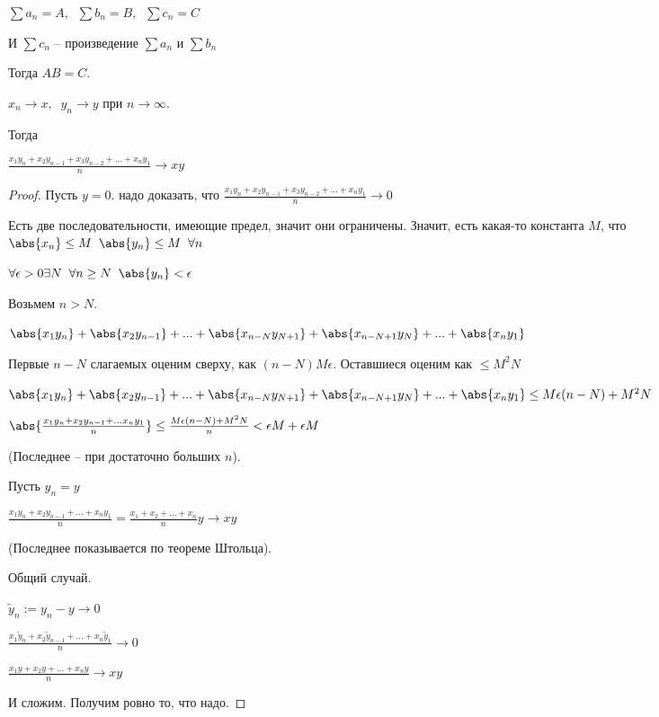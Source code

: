 
\begin{theorem}[Абеля]\slashns
	
	$\sum a_n = A, \;\; \sum b_n = B, \;\; \sum c_n = C$
	
	И $\sum c_n$ -- произведение $\sum a_n$ и $\sum b_n$
	
	Тогда $AB=C$.
\end{theorem}

\begin{lemma}\slashns
	
	$x_n \to x,\;\;y_n \to y$ при $n\to\infty$.
	
	Тогда 
	
	$\frac{x_1y_n+x_2y_{n-1}+x_3y_{n-2}+...+x_ny_1}{n} \to xy$
\end{lemma}

\begin{proof}\slashns
	
	Пусть $y = 0$. надо доказать, что $\frac{x_1y_n+x_2y_{n-1}+x_3y_{n-2}+...+x_ny_1}{n} \to 0$
	
	Есть две последовательности, имеющие предел, значит они ограничены. Значит, есть какая-то константа $M$, что $\abs{x_n} \le M \;\; \abs{y_n} \le M \;\; \forall n$
	
	$\forall \epsilon > 0 \exists N \;\; \forall n \ge N \;\; \abs{y_n} < \epsilon$
	
	Возьмем $n > N$.
	
	$\abs{x_1y_n}+\abs{x_2y_{n-1}}+...+\abs{x_{n - N}y_{N+1}} + \abs{x_{n - N + 1}y_{N}} + ...+ \abs{x_ny_1}$
	
	Первые $n-N$ слагаемых оценим сверху, как $(n-N)M\epsilon$. Оставшиеся оценим как $\le M^2N$
	
	$\abs{x_1y_n}+\abs{x_2y_{n-1}}+...+\abs{x_{n - N}y_{N+1}} + \abs{x_{n - N + 1}y_{N}} + ...+ \abs{x_ny_1} \le M\epsilon(n-N) + M^2N$
	
	$\abs{\frac{x_1y_n + x_2y_{n-1} + ...x_ny_1}{n}} \le \frac{M\epsilon(n-N) + M^2N}{n} < \epsilon M + \epsilon M$
	
	(Последнее -- при достаточно больших $n$).
	
	Пусть $y_n = y$
	
	$\frac{x_1y_n+x_2y_{n-1}+...+x_ny_1}{n} = \frac{x_1+x_2+...+x_n}{n}y \to xy$
	
	(Последнее показывается по теореме Штольца).
	
	Общий случай.
	
	$\tilde{y}_n := y_n - y \to 0$
	
	$\frac{x_1\tilde{y}_n+x_2\tilde{y}_{n-1}+...+x_n\tilde{y}_1}{n} \to 0$
	
	$\frac{x_1y+x_2y+...+x_ny}{n} \to xy$
	
	И сложим. Получим ровно то, что надо.
	
\end{proof}

